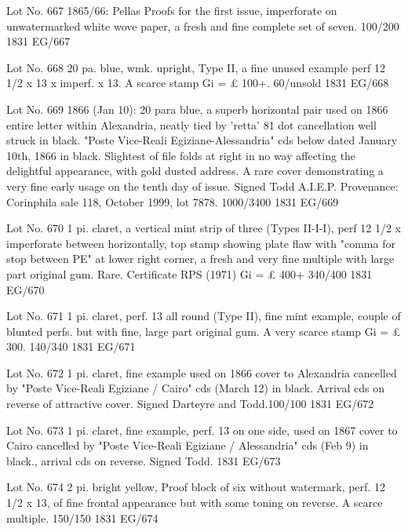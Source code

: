 \documentclass[justified]{tufte-book}
\begin{document}
%
{Lot No. 667
1865/66: Pellas Proofs for the first issue, imperforate on unwatermarked white wove paper, a fresh and fine complete set of seven. 100/200
}%
{1831}%
{EG/667}%
{}%
{}
{}%
{}

%
{Lot No. 668
20 pa. blue, wmk. upright, Type II, a fine unused example perf 12 1/2 x 13 x imperf. x 13. A scarce stamp Gi = £ 100+. 60/unsold
}%
{1831}%
{EG/668}%
{}%
{}
{}%
{}

%
{Lot No. 669
1866 (Jan 10): 20 para blue, a superb horizontal pair used on 1866 entire letter within Alexandria, neatly tied by 'retta' 81 dot cancellation well struck in black. "Poste Vice-Reali Egiziane-Alessandria" cds below dated January 10th, 1866 in black. Slightest of file folds at right in no way affecting the delightful appearance, with gold dusted address. A rare cover demonstrating a very fine early usage on the tenth day of issue. Signed Todd A.I.E.P. Provenance: Corinphila sale 118, October 1999, lot 7878. 1000/3400
}%
{1831}%
{EG/669}%
{}%
{}
{}%
{}

%
{Lot No. 670
1 pi. claret, a vertical mint strip of three (Types II-I-I), perf 12 1/2 x imperforate between horizontally, top stamp showing plate flaw with "comma for stop between PE" at lower right corner, a fresh and very fine multiple with large part original gum. Rare. Certificate RPS (1971) Gi = £ 400+ 340/400
}%
{1831}%
{EG/670}%
{}%
{}
{}%
{}


%
{Lot No. 671
1 pi. claret, perf. 13 all round (Type II), fine mint example, couple of blunted perfs. but with fine, large part original gum. A very scarce stamp Gi = £ 300. 140/340
}%
{1831}%
{EG/671}%
{}%
{}
{}%
{}

%
{Lot No. 672
1 pi. claret, fine example used on 1866 cover to Alexandria cancelled by "Poste Vice-Reali Egiziane / Cairo" cds (March 12) in black. Arrival cds on reverse of attractive cover. Signed Darteyre and Todd.100/100
}%
{1831}%
{EG/672}%
{}%
{}
{}%
{}

%
{Lot No. 673
1 pi. claret, fine example, perf. 13 on one side, used on 1867 cover to Cairo cancelled by "Poste Vice-Reali Egiziane / Alessandria" cds (Feb 9) in black., arrival cds on reverse. Signed Todd.
}%
{1831}%
{EG/673}%
{}%
{}
{}%
{}

%
{Lot No. 674
2 pi. bright yellow, Proof block of six without watermark, perf. 12 1/2 x 13, of fine frontal appearance but with some toning on reverse. A scarce multiple. 150/150
}%
{1831}%
{EG/674}%
{}%
{}
{}%
{}
\end{document}
